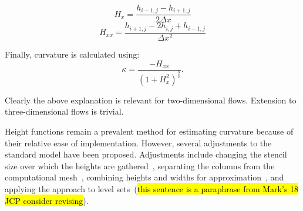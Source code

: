\begin{equation}
H_{x} = \frac{h_{i-1,j}-h_{i+1,j}}{2 \Delta x}
\label{eqn:1st}
\end{equation}
\begin{equation}
H_{xx} = \frac{h_{i+1,j}-2h_{i,j}+h_{i-1,j}}{ \Delta x^2}
\label{eqn:2nd}
\end{equation}

\noindent Finally, curvature is calculated using:
\begin{equation}
\kappa = \frac{-H_{xx}}{(1+H_{x}^{2})^{\frac{3}{2}}}.
\label{eqn:kap}
\end{equation}

\noindent Clearly the above explanation is relevant for two-dimensional flows. Extension to three-dimensional flows is trivial. 

Height functions remain a prevalent method for estimating curvature because of their relative ease of implementation. However, several adjustments to the standard model have been proposed. Adjustments include changing the stencil size over which the heights are gathered~\cite{1}, separating the columns from the computational mesh~\cite{2}, combining heights and widths for approximation~\cite{2}, and applying the approach to level sets~\cite{2}(\hl{this sentence is a paraphrase from Mark's 18 JCP consider revising}).


